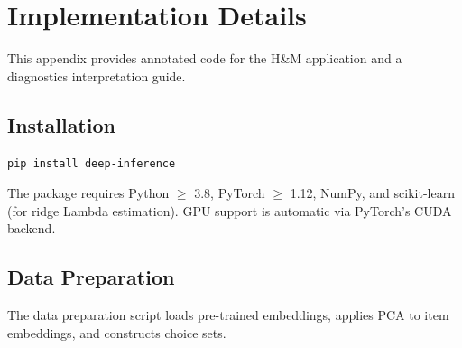 \section{Implementation Details}\label{app:implementation}

This appendix provides annotated code for the H\&M application and a diagnostics interpretation guide.

\subsection{Installation}

\begin{lstlisting}[language=bash, numbers=none]
pip install deep-inference
\end{lstlisting}

\noindent The package requires Python $\geq$ 3.8, PyTorch $\geq$ 1.12, NumPy, and scikit-learn (for ridge Lambda estimation). GPU support is automatic via PyTorch's CUDA backend.

\subsection{Data Preparation}

The data preparation script loads pre-trained embeddings, applies PCA to item embeddings, and constructs choice sets.

